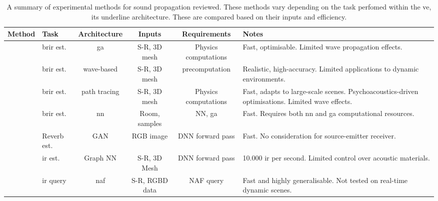 \begin{landscape}
    \begin{table}[tbp]
        \centering
        \caption[A summary of experimental methods for sound propagation]{A summary of experimental methods for sound propagation reviewed. These methods vary depending on the task perfomed within the \acrshort{ve}, its underline architecture. These are compared based on their inputs and efficiency.}
            
            \begin{tabularx}{\linewidth}{llcccX}
                \toprule
                Method                                            & Task                     & Architecture   & Inputs                        & Requirements        & Notes \\ \midrule
                \cite{schroder2011physically} & \acrshort{brir} est.     & \acrshort{ga}  & S-R, 3D mesh   & Physics computations              & Fast, optimisable. Limited wave propagation effects. \\
                \cite{mehra2015wave}                              & \acrshort{brir} est.     & wave-based     & S-R, 3D mesh                  & precomputation      & Realistic, high-accuracy. Limited applications to dynamic environments. \\
                \cite{schissler2016interactive}                   & \acrshort{brir} est.     & path tracing   & S-R, 3D mesh                  & Physics computations & Fast, adapts to large-scale scenes. Psychoacoustics-driven optimisations. Limited wave effects. \\
                \cite{tang2020scene}                              & \acrshort{brir} est.     & \acrshort{nn}  & Room, samples\footnotemark[1] & NN, \acrshort{ga}   & Fast. Requires both \acrshort{nn} and \acrshort{ga} computational resources.\\
                \cite{Singh_2021_ICCV}                            & Reverb est.              & GAN            & RGB image                     & DNN forward pass    & Fast. No consideration for source-emitter receiver. \\
                \cite{ratnarajah2022mesh2ir}                      & \acrshort{ir} est.       & Graph NN       & S-R, 3D Mesh                  & DNN forward pass    & 10.000 \acrshort{ir} per second\footnotemark[2]. Limited control over acoustic materials.\\
                \cite{liang2023neural}                            & \acrshort{ir} query      & \acrshort{naf} & S-R, RGBD data                & NAF query           & Fast and highly generalisable. Not tested on real-time dynamic scenes.\\ 

\end{tabularx}
\end{table}
\end{landscape}
